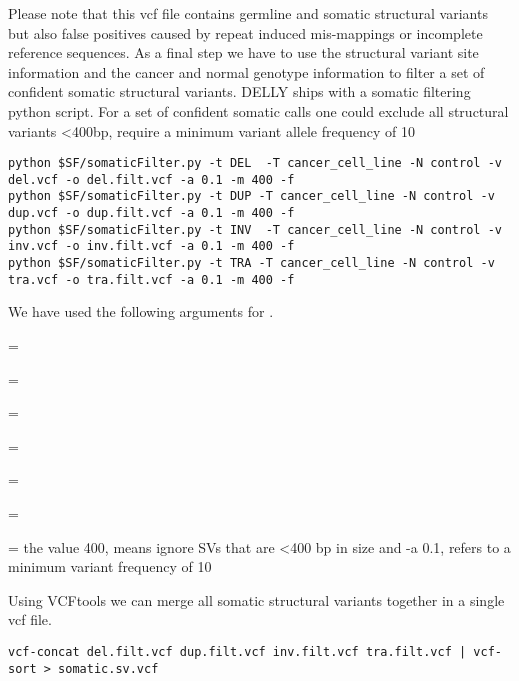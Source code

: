 \begin{steps}
\begin{information}
Please note that this vcf file contains germline and somatic structural variants but also false positives caused by repeat induced mis-mappings or incomplete reference sequences. As a final step we have to use the structural variant site information and the cancer and normal genotype information to filter a set of confident somatic structural variants. DELLY ships with a somatic filtering python script. For a set of confident somatic calls one could exclude all structural variants <400bp, require a minimum variant allele frequency of 10%

\end{information}
\begin{steps}
\begin{lstlisting}
python $SF/somaticFilter.py -t DEL  -T cancer_cell_line -N control -v del.vcf -o del.filt.vcf -a 0.1 -m 400 -f
python $SF/somaticFilter.py -t DUP -T cancer_cell_line -N control -v dup.vcf -o dup.filt.vcf -a 0.1 -m 400 -f
python $SF/somaticFilter.py -t INV  -T cancer_cell_line -N control -v inv.vcf -o inv.filt.vcf -a 0.1 -m 400 -f
python $SF/somaticFilter.py -t TRA -T cancer_cell_line -N control -v tra.vcf -o tra.filt.vcf -a 0.1 -m 400 -f
\end{lstlisting}
\end{steps}

We have used the following arguments for .
\begin{description}[style=multiline,labelindent=0cm,align=right,leftmargin=\descriptionlabelspace,rightmargin=1.5cm,font=\ttfamily]
  \item[-t] = 
  \item[-T] = 
  \item[-N] = 
  \item[-v] = 
  \item[-o] = 
  \item[-a] = 
  \item[-m] = the value 400, means ignore SVs that are <400 bp in size and -a 0.1, refers to a minimum variant frequency of 10%
\end{description}


\begin{steps}
Using VCFtools we can merge all somatic structural variants together in a single vcf file.
\begin{lstlisting}
vcf-concat del.filt.vcf dup.filt.vcf inv.filt.vcf tra.filt.vcf | vcf-sort > somatic.sv.vcf
\end{lstlisting}
\end{steps}


\end{steps}
